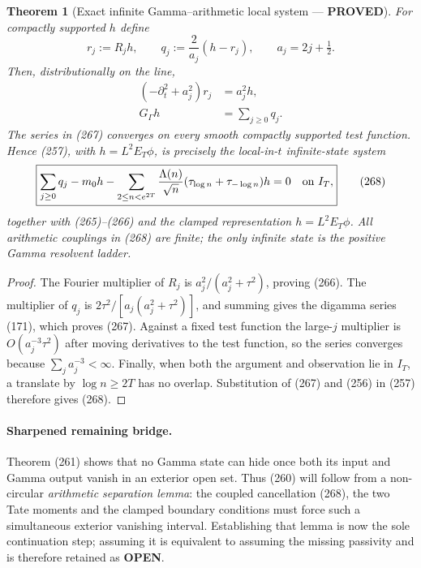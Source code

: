 \documentclass[11pt]{article}
\newtheorem{theorem}{Theorem}
\newcommand{\PROVED}{\textcolor{green!45!black}{\textbf{PROVED}}}
\newcommand{\OPEN}{\textcolor{red!70!black}{\textbf{OPEN}}}
\begin{document}
\begin{theorem}[Exact infinite Gamma--arithmetic local system --- \PROVED]
For compactly supported $h$ define
\begin{equation}
 r_j:=R_jh,
 \qquad q_j:=\frac2{a_j}(h-r_j),
 \qquad a_j=2j+\tfrac12.                              \tag{265}
\end{equation}
Then, distributionally on the line,
\begin{align}
 (-\partial_t^2+a_j^2)r_j&=a_j^2h,                    \tag{266}\\
 G_\Gamma h&=\sum_{j\ge0}q_j.                         \tag{267}
\end{align}
The series in (267) converges on every smooth compactly supported test
function.  Hence (257), with $h=L^2E_T\phi$, is precisely the local-in-$t$
infinite-state system
\begin{equation}
 \boxed{
 \sum_{j\ge0}q_j-m_0h
 -\sum_{2\le n<e^{2T}}\frac{\Lambda(n)}{\sqrt n}
       (\tau_{\log n}+\tau_{-\log n})h=0
 \quad\hbox{on }I_T,}                                \tag{268}
\end{equation}
together with (265)--(266) and the clamped representation
$h=L^2E_T\phi$.  All arithmetic couplings in (268) are finite; the only
infinite state is the positive Gamma resolvent ladder.
\end{theorem}

\begin{proof}
The Fourier multiplier of $R_j$ is $a_j^2/(a_j^2+\tau^2)$, proving (266).
The multiplier of $q_j$ is
$2\tau^2/[a_j(a_j^2+\tau^2)]$, and summing gives the digamma series (171),
which proves (267).  Against a fixed test function the large-$j$ multiplier
is $O(a_j^{-3}\tau^2)$ after moving derivatives to the test function, so
the series converges because $\sum_j a_j^{-3}<\infty$.  Finally, when both
the argument and observation lie in $I_T$, a translate by $\log n\ge2T$
has no overlap.  Substitution of (267) and (256) in (257) therefore gives
(268).
\end{proof}

\paragraph{Sharpened remaining bridge.}
Theorem (261) shows that no Gamma state can hide once both its input and
Gamma output vanish in an exterior open set.  Thus (260) will follow from a
non-circular \emph{arithmetic separation lemma}: the coupled cancellation
(268), the two Tate moments and the clamped boundary conditions must force
such a simultaneous exterior vanishing interval.  Establishing that lemma
is now the sole continuation step; assuming it is equivalent to assuming
the missing passivity and is therefore retained as \OPEN{}.
\end{document}
